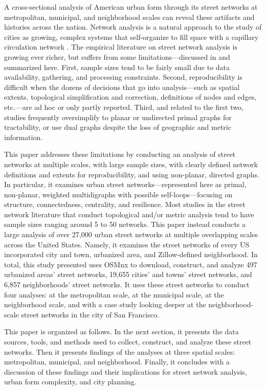 \documentclass[Afour,sageh,times]{sage/sagej}
\begin{document}
A cross-sectional analysis of American urban form through its street networks at metropolitan, municipal, and neighborhood scales can reveal these artifacts and histories across the nation. Network analysis is a natural approach to the study of cities as growing, complex systems that self-organize to fill space with a capillary circulation network \cite{masucci_random_2009}. The empirical literature on street network analysis is growing ever richer, but suffers from some limitations---discussed in \cite{boeing_osmnx:_2017} and summarized here. First, sample sizes tend to be fairly small due to data availability, gathering, and processing constraints. Second, reproducibility is difficult when the dozens of decisions that go into analysis---such as spatial extents, topological simplification and correction, definitions of nodes and edges, etc.---are ad hoc or only partly reported. Third, and related to the first two, studies frequently oversimplify to planar or undirected primal graphs for tractability, or use dual graphs despite the loss of geographic and metric information. 

This paper addresses these limitations by conducting an analysis of street networks at multiple scales, with large sample sizes, with clearly defined network definitions and extents for reproducibility, and using non-planar, directed graphs. In particular, it examines urban street networks---represented here as primal, non-planar, weighted multidigraphs with possible self-loops---focusing on structure, connectedness, centrality, and resilience. Most studies in the street network literature that conduct topological and/or metric analysis tend to have sample sizes ranging around 5 to 50 networks. This paper instead conducts a large analysis of over 27,000 urban street networks at multiple overlapping scales across the United States. Namely, it examines the street networks of every US incorporated city and town, urbanized area, and Zillow-defined neighborhood. In total, this study presented uses OSMnx \cite{boeing_osmnx:_2017} to download, construct, and analyze 497 urbanized areas' street networks, 19,655 cities' and towns' street networks, and 6,857 neighborhoods' street networks. It uses these street networks to conduct four analyses: at the metropolitan scale, at the municipal scale, at the neighborhood scale, and with a case study looking deeper at the neighborhood-scale street networks in the city of San Francisco.

This paper is organized as follows. In the next section, it presents the data sources, tools, and methods used to collect, construct, and analyze these street networks. Then it presents findings of the analyses at three spatial scales: metropolitan, municipal, and neighborhood. Finally, it concludes with a discussion of these findings and their implications for street network analysis, urban form complexity, and city planning.
\end{document}
